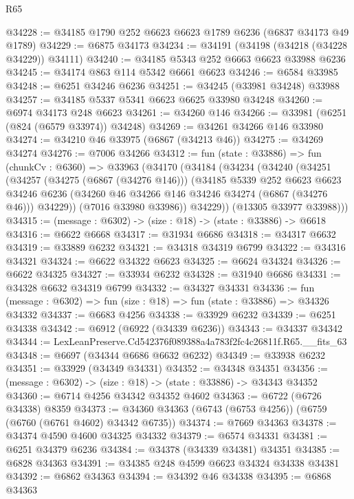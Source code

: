 \begin{lexlean}{R65}
\begin{coremodule}
{@34228 := @34185 @1790 @252 @6623 @6623 @1789 @6236 (@6837 @34173 @49 @1789)
@34229 := @6875 @34173
@34234 := @34191 (@34198 (@34218 (@34228 @34229)) @34111)
@34240 := @34185 @5343 @252 @6663 @6623 @33988 @6236
@34245 := @34174 @863 @114 @5342 @6661 @6623
@34246 := @6584 @33985
@34248 := @6251 @34246 @6236
@34251 := @34245 (@33981 @34248) @33988
@34257 := @34185 @5337 @5341 @6623 @6625 @33980 @34248
@34260 := @6974 @34173 @248 @6623
@34261 := @34260 @146
@34266 := @33981 (@6251 (@824 (@6579 @33974)) @34248)
@34269 := @34261 @34266 @146 @33980
@34274 := @34210 @46 @33975 (@6867 (@34213 @46))
@34275 := @34269 @34274
@34276 := @7006 @34266
@34312 := fun (state : @33886) =>
  fun (chunkCv : @6360) =>
  @33963
    (@34170
      (@34184
        (@34234
          (@34240
            (@34251
              (@34257
                (@34275 (@6867 (@34276 @146)))
                (@34185
                  @5339
                  @252
                  @6623
                  @6623
                  @34246
                  @6236
                  (@34260 @46 @34266 @146 @34246 @34274 (@6867 (@34276 @46)))
                  @34229))
              (@7016 @33980 @33986))
            @34229))
        (@13305 @33977 @33988)))
@34315 := (message : @6302) -> (size : @18) -> (state : @33886) -> @6618
@34316 := @6622 @6668
@34317 := @31934 @6686
@34318 := @34317 @6632
@34319 := @33889 @6232
@34321 := @34318 @34319 @6799
@34322 := @34316 @34321
@34324 := @6622 @34322 @6623
@34325 := @6624 @34324
@34326 := @6622 @34325
@34327 := @33934 @6232
@34328 := @31940 @6686
@34331 := @34328 @6632 @34319 @6799
@34332 := @34327 @34331
@34336 := fun (message : @6302) => fun (size : @18) => fun (state : @33886) => @34326 @34332
@34337 := @6683 @4256
@34338 := @33929 @6232
@34339 := @6251 @34338
@34342 := @6912 (@6922 (@34339 @6236))
@34343 := @34337 @34342
@34344 := LexLeanPreserve.Cd542376f089388a4a783f2fc4c26811f.R65.__fits_63
@34348 := @6697 (@34344 @6686 @6632 @6232)
@34349 := @33938 @6232
@34351 := @33929 (@34349 @34331)
@34352 := @34348 @34351
@34356 := (message : @6302) -> (size : @18) -> (state : @33886) -> @34343 @34352
@34360 := @6714 @4256 @34342 @34352 @4602
@34363 := @6722 (@6726 @34338) @8359
@34373 := @34360 @34363 (@6743 (@6753 @4256)) (@6759 (@6760 (@6761 @4602) @34342 @6735))
@34374 := @7669 @34363
@34378 := @34374 @4590 @4600 @34325 @34332
@34379 := @6574 @34331
@34381 := @6251 @34379 @6236
@34384 := @34378 (@34339 @34381) @34351
@34385 := @6828 @34363
@34391 := @34385 @248 @4599 @6623 @34324 @34338 @34381
@34392 := @6862 @34363
@34394 := @34392 @46 @34338
@34395 := @6868 @34363
}
\end{coremodule}
\end{lexlean}
